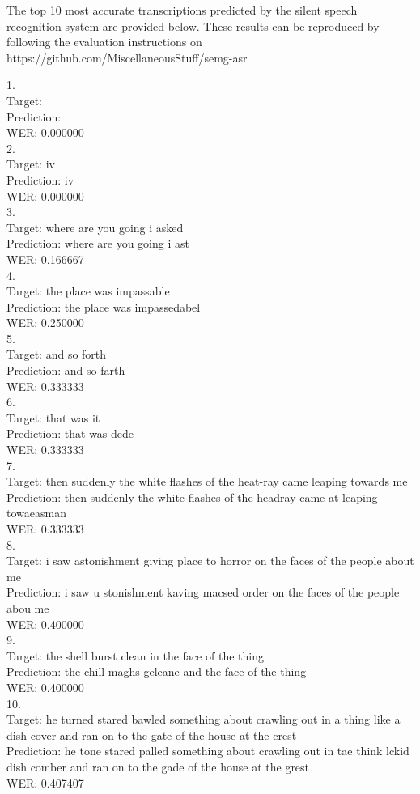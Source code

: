 The top 10 most accurate transcriptions predicted by the silent speech recognition
system are provided below. These results can be reproduced by following
the evaluation instructions on
https://github.com/MiscellaneousStuff/semg-asr

1.\\
 Target:     \\
 Prediction: \\
 WER: 0.000000\\
2.\\
 Target:     iv\\
 Prediction: iv\\
 WER: 0.000000\\
3.\\
 Target:     where are you going i asked\\
 Prediction: where are you going i ast\\
 WER: 0.166667\\
4.\\
 Target:     the place was impassable\\
 Prediction: the place was impassedabel\\
 WER: 0.250000\\
5.\\
 Target:     and so forth\\
 Prediction: and so farth\\
 WER: 0.333333\\
6.\\
 Target:     that was it\\
 Prediction: that was dede\\
 WER: 0.333333\\
7.\\
 Target:     then suddenly the white flashes of the heat-ray came leaping towards me\\
 Prediction: then suddenly the white flashes of the headray came at leaping towaeasman\\
 WER: 0.333333\\
8.\\
 Target:     i saw astonishment giving place to horror on the faces of the people about me\\
 Prediction: i saw u stonishment kaving macsed order on the faces of the people abou me\\
 WER: 0.400000\\
9.\\
 Target:     the shell burst clean in the face of the thing\\
 Prediction: the chill maghs geleane and the face of the thing\\
 WER: 0.400000\\
10.\\
 Target:     he turned stared bawled something about crawling out in a thing like a dish cover and ran on to the gate of the house at the crest\\
 Prediction: he tone stared palled something about crawling out in tae think lckid dish comber and ran on to the gade of the house at the grest\\
 WER: 0.407407